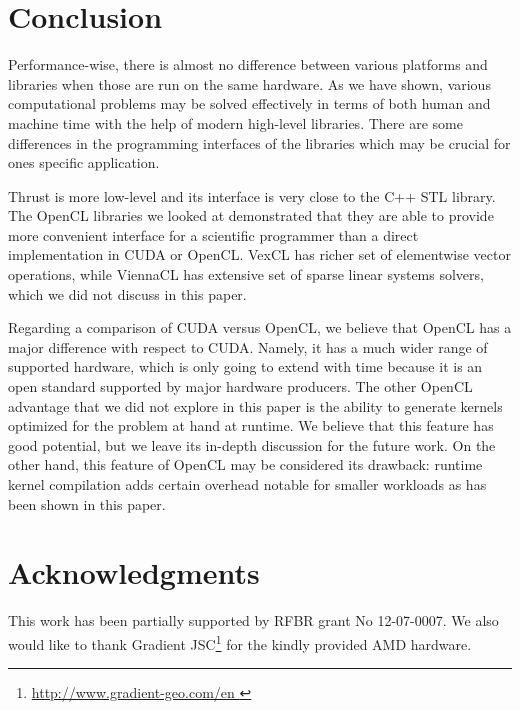 \documentclass[1p]{elsarticle}
\begin{document}
%
%
\section{Conclusion}

Performance-wise, there is almost no difference between various platforms and
libraries when those are run on the same hardware. As we have shown, various
computational problems may be solved effectively in terms of both human and
machine time with the help of modern high-level libraries.  There are some
differences in the programming interfaces of the libraries which may be crucial
for ones specific application.

Thrust is more low-level and its interface is very close to the C++ STL
library.  The OpenCL libraries we looked at demonstrated that they are able to
provide more convenient interface for a scientific programmer than a direct
implementation in CUDA or OpenCL.  VexCL has richer set of elementwise vector
operations, while ViennaCL has extensive set of sparse linear systems solvers,
which we did not discuss in this paper.

Regarding a comparison of CUDA versus OpenCL, we believe that OpenCL has a
major difference with respect to CUDA. Namely, it has a  much wider range of
supported hardware, which is only going to extend with time because it is an
open standard supported by major hardware producers. The other OpenCL advantage
that we did not explore in this paper is the ability to generate kernels
optimized for the problem at hand at runtime. We believe that this feature has
good potential, but we leave its in-depth discussion for the future work.  On
the other hand, this feature of OpenCL may be considered its drawback: runtime
kernel compilation adds certain overhead notable for smaller workloads as has
been shown in this paper.





\section{Acknowledgments}

This work has been partially supported by RFBR grant No 12-07-0007. We also
would like to thank Gradient JSC\footnote{ \href{
http://www.gradient-geo.com/en }{ http://www.gradient-geo.com/en } } for the
kindly provided AMD hardware.




\end{document}

